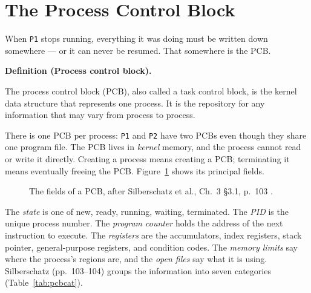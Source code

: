 \documentclass[11pt]{article}
\newenvironment{definitionbox}[1]{%
  \par\noindent\textbf{Definition (#1).}\ \itshape
}{\par\vspace{0.3em}}
\begin{document}
\section{The Process Control Block}

\noindent{}

When \texttt{P1} stops running, everything it was doing must be written down
somewhere --- or it can never be resumed. That somewhere is the PCB.

\begin{definitionbox}{Process control block}
The process control block (PCB), also called a task control block, is the
kernel data structure that represents one process. It is the repository for any
information that may vary from process to process.
\end{definitionbox}

There is one PCB per process: \texttt{P1} and \texttt{P2} have two PCBs even
though they share one program file. The PCB lives in \emph{kernel} memory, and
the process cannot read or write it directly. Creating a process means creating
a PCB; terminating it means eventually freeing the PCB. Figure~\ref{fig:pcb}
shows its principal fields.

\begin{figure}[h]
\centering
{}
\caption{The fields of a PCB, after Silberschatz et al., Ch.~3 \S3.1, p.~103
\cite{SilberschatzOSC_operating_system_concepts}.}
\label{fig:pcb}
\end{figure}

The \emph{state} is one of new, ready, running, waiting, terminated. The
\emph{PID} is the unique process number. The \emph{program counter} holds the
address of the next instruction to execute. The \emph{registers} are the
accumulators, index registers, stack pointer, general-purpose registers, and
condition codes. The \emph{memory limits} say where the process's regions are,
and the \emph{open files} say what it is using. Silberschatz (pp.~103--104)
groups the information into seven categories (Table~\ref{tab:pcbcat}).
\end{document}
